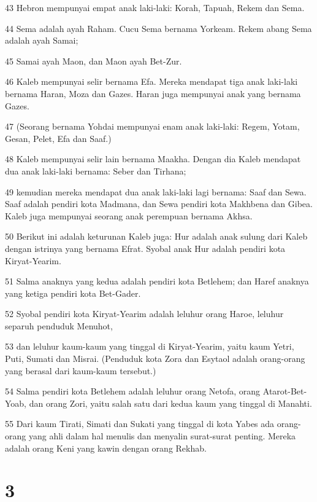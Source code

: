\par 43 Hebron mempunyai empat anak laki-laki: Korah, Tapuah, Rekem dan Sema.
\par 44 Sema adalah ayah Raham. Cucu Sema bernama Yorkeam. Rekem abang Sema adalah ayah Samai;
\par 45 Samai ayah Maon, dan Maon ayah Bet-Zur.
\par 46 Kaleb mempunyai selir bernama Efa. Mereka mendapat tiga anak laki-laki bernama Haran, Moza dan Gazes. Haran juga mempunyai anak yang bernama Gazes.
\par 47 (Seorang bernama Yohdai mempunyai enam anak laki-laki: Regem, Yotam, Gesan, Pelet, Efa dan Saaf.)
\par 48 Kaleb mempunyai selir lain bernama Maakha. Dengan dia Kaleb mendapat dua anak laki-laki bernama: Seber dan Tirhana;
\par 49 kemudian mereka mendapat dua anak laki-laki lagi bernama: Saaf dan Sewa. Saaf adalah pendiri kota Madmana, dan Sewa pendiri kota Makhbena dan Gibea. Kaleb juga mempunyai seorang anak perempuan bernama Akhsa.
\par 50 Berikut ini adalah keturunan Kaleb juga: Hur adalah anak sulung dari Kaleb dengan istrinya yang bernama Efrat. Syobal anak Hur adalah pendiri kota Kiryat-Yearim.
\par 51 Salma anaknya yang kedua adalah pendiri kota Betlehem; dan Haref anaknya yang ketiga pendiri kota Bet-Gader.
\par 52 Syobal pendiri kota Kiryat-Yearim adalah leluhur orang Haroe, leluhur separuh penduduk Menuhot,
\par 53 dan leluhur kaum-kaum yang tinggal di Kiryat-Yearim, yaitu kaum Yetri, Puti, Sumati dan Misrai. (Penduduk kota Zora dan Esytaol adalah orang-orang yang berasal dari kaum-kaum tersebut.)
\par 54 Salma pendiri kota Betlehem adalah leluhur orang Netofa, orang Atarot-Bet-Yoab, dan orang Zori, yaitu salah satu dari kedua kaum yang tinggal di Manahti.
\par 55 Dari kaum Tirati, Simati dan Sukati yang tinggal di kota Yabes ada orang-orang yang ahli dalam hal menulis dan menyalin surat-surat penting. Mereka adalah orang Keni yang kawin dengan orang Rekhab.

\chapter{3}

